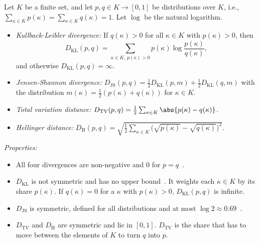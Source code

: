 \begin{definition}[Divergences]
	\label{def:prelim:divergences}
	Let $K$ be a finite set, and let $p, q \in K \to [0, 1]$ be distributions over $K$, i.e., $\sum_{\kappa \in K} p(\kappa) = \sum_{\kappa \in K} q(\kappa) = 1$. Let $\log$ be the natural logarithm.
	\begin{itemize}
		\item \emph{Kullback-Leibler divergence:} If $q(\kappa) > 0$ for all $\kappa \in K$ with $p(\kappa) > 0$, then
		      \[
			      D_{\mathrm{KL}}(p, q) = \sum_{\kappa \in K,\, p(\kappa) > 0} p(\kappa) \log \frac{p(\kappa)}{q(\kappa)},
		      \]
		      and otherwise $D_{\mathrm{KL}}(p, q) = \infty$.
		\item \emph{Jensen-Shannon divergence:} $D_{\mathrm{JS}}(p, q) = \frac{1}{2} D_{\mathrm{KL}}(p, m) + \frac{1}{2} D_{\mathrm{KL}}(q, m)$ with the distribution $m(\kappa) = \frac{1}{2} (p(\kappa) + q(\kappa))$ for $\kappa \in K$.
		\item \emph{Total variation distance:} $D_{\mathrm{TV}}(p, q) = \frac{1}{2} \sum_{\kappa \in K} \abs{p(\kappa) - q(\kappa)}$.
		\item \emph{Hellinger distance:} $D_{\mathrm{H}}(p, q) = \sqrt{\frac{1}{2} \sum_{\kappa \in K} \bigl(\sqrt{p(\kappa)} - \sqrt{q(\kappa)}\bigr)^2}$.
	\end{itemize}
\end{definition}

\noindent\emph{Properties:}
\begin{itemize}[beginpenalty=10000]
	\item All four divergences are non-negative and 0 for $p = q$~\autocite{haykin2009neural, lin1991divergence}.
	\item $D_{\mathrm{KL}}$ is not symmetric and has no upper bound~\autocite{lin1991divergence}. It weights each $\kappa \in K$ by its share $p(\kappa)$. If $q(\kappa) = 0$ for a $\kappa$ with $p(\kappa) > 0$, $D_{\mathrm{KL}}(p, q)$ is infinite.
	\item $D_{\mathrm{JS}}$ is symmetric, defined for all distributions and at most $\log 2 \approx 0.69$~\autocite{lin1991divergence}.
	\item $D_{\mathrm{TV}}$ and $D_{\mathrm{H}}$ are symmetric and lie in $[0, 1]$. $D_{\mathrm{TV}}$ is the share that has to move between the elements of $K$ to turn $q$ into $p$.
\end{itemize}

